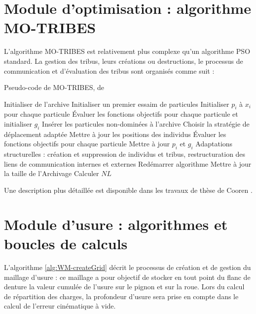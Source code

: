 \FloatBarrier
\section{Module d'optimisation : algorithme MO-TRIBES}\label{ann:motribes}

L'algorithme MO-TRIBES est relativement plus complexe qu'un algorithme PSO standard. La gestion des tribus, leurs créations ou destructions, le processus de communication et d'évaluation des tribus sont organisés comme suit :

\begin{algorithm}
\caption{Pseudo-code de  MO-TRIBES, de \cite{Cooren2010}}
\label{alg:OP-moEvolution}
  \begin{algorithmic}
	\State Initialiser de l’archive
  \State Initialiser un premier essaim de particules
  \State Initialiser $p_i$ à $x_i$ pour chaque particule
  \State Évaluer les fonctions objectifs pour chaque particule et initialiser $g_i$
  \State Insérer les particules non-dominées à l’archive
		\State Choisir la stratégie de déplacement adaptée
		\State Mettre à jour les positions des individus
		\State Évaluer les fonctions objectifs pour chaque particule
    \State Mettre à jour $p_i$ et $g_i$
      \State Adaptations structurelles : création et suppression de individus et tribus, restructuration des liens de communication internes et externes
          \State Redémarrer algorithme
          \State Mettre à jour la taille de l’Archivage
        \EndIf
        \State Calculer $NL$
    \EndIf
    \EndWhile
  \end{algorithmic}
\end{algorithm}

Une description plus détaillée est disponible dans les travaux de thèse de Cooren \cite{Cooren2010}.

\newpage
\section{Module d'usure : algorithmes et boucles de calculs}\label{ann:boucles}

L'algorithme \ref{alg:WM-createGrid} décrit le processus de création et de gestion du maillage d'usure : ce maillage a pour objectif de stocker en tout point du flanc de denture la valeur cumulée de l'usure sur le pignon et sur la roue. Lors du calcul de répartition des charges, la profondeur d'usure sera prise en compte dans le calcul de l'erreur cinématique à vide.

